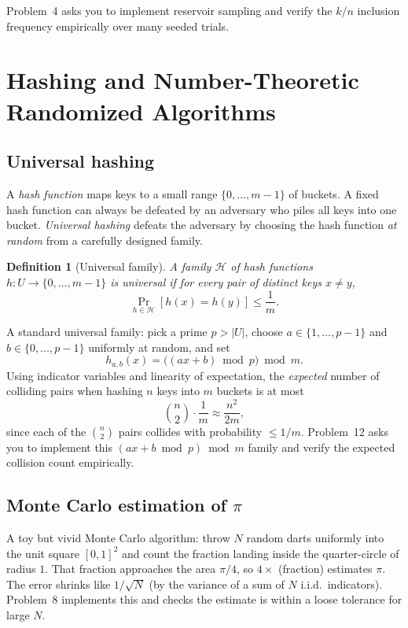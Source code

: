 \documentclass[11pt]{article}
\newtheorem{definition}[theorem]{Definition}
\begin{document}
Problem~4 asks you to implement reservoir sampling and verify the $k/n$ inclusion
frequency empirically over many seeded trials.

\section{Hashing and Number-Theoretic Randomized Algorithms}

\subsection{Universal hashing}

A \emph{hash function} maps keys to a small range $\{0, \ldots, m-1\}$ of buckets.
A fixed hash function can always be defeated by an adversary who piles all keys
into one bucket. \emph{Universal hashing} defeats the adversary by choosing the
hash function \emph{at random} from a carefully designed family.

\begin{definition}[Universal family]
A family $\mathcal H$ of hash functions $h : U \to \{0,\ldots,m-1\}$ is
\emph{universal} if for every pair of distinct keys $x \ne y$,
\[
    \Pr_{h \in \mathcal H}[h(x) = h(y)] \le \frac1m.
\]
\end{definition}

A standard universal family: pick a prime $p > |U|$, choose $a \in \{1,\ldots,p-1\}$
and $b \in \{0,\ldots,p-1\}$ uniformly at random, and set
\[
    h_{a,b}(x) = \bigl((a x + b) \bmod p\bigr) \bmod m.
\]
Using indicator variables and linearity of expectation, the \emph{expected} number
of colliding pairs when hashing $n$ keys into $m$ buckets is at most
\[
    \binom{n}{2}\cdot\frac1m \approx \frac{n^2}{2m},
\]
since each of the $\binom n2$ pairs collides with probability $\le 1/m$.
Problem~12 asks you to implement this $(ax+b \bmod p)\bmod m$ family and verify the
expected collision count empirically.

\subsection{Monte Carlo estimation of $\pi$}

A toy but vivid Monte Carlo algorithm: throw $N$ random darts uniformly into the
unit square $[0,1]^2$ and count the fraction landing inside the quarter-circle of
radius $1$. That fraction approaches the area $\pi/4$, so $4 \times$ (fraction)
estimates $\pi$. The error shrinks like $1/\sqrt N$ (by the variance of a sum of
$N$ i.i.d.\ indicators). Problem~8 implements this and checks the estimate is
within a loose tolerance for large $N$.
\end{document}
